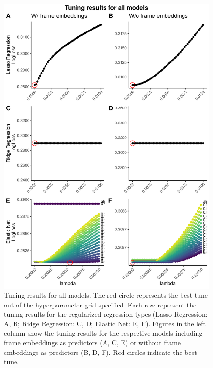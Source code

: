 \documentclass[
  man,floatsintext]{apa6}
\begin{document}
\begin{figure}
\includegraphics[width=0.9\linewidth]{FinalReport_files/figure-latex/tuning-1} \caption{Tuning results for all models. The red circle represents the best tune out of the hyperparameter grid specified. Each row represent the tuning results for the regularized regression types (Lasso Regression: A, B; Ridge Regression: C, D; Elastic Net: E, F). Figures in the left column show the tuning results for the respective models including frame embeddings as predictors (A, C, E) or without frame embeddings as predictors (B, D, F). Red circles indicate the best tune.}\label{fig:tuning}
\end{figure}
\end{document}
